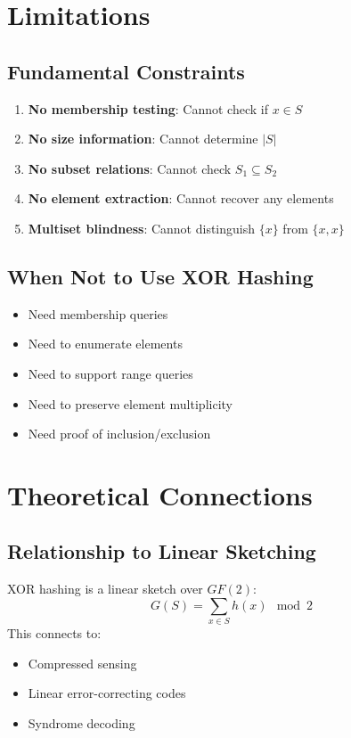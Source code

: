 \documentclass[11pt,final,hidelinks]{article}
\begin{document}
\section{Limitations}

\subsection{Fundamental Constraints}

\begin{enumerate}
    \item \textbf{No membership testing}: Cannot check if $x \in S$
    \item \textbf{No size information}: Cannot determine $|S|$
    \item \textbf{No subset relations}: Cannot check $S_1 \subseteq S_2$
    \item \textbf{No element extraction}: Cannot recover any elements
    \item \textbf{Multiset blindness}: Cannot distinguish $\{x\}$ from $\{x, x\}$
\end{enumerate}

\subsection{When Not to Use XOR Hashing}

\begin{itemize}
    \item Need membership queries
    \item Need to enumerate elements
    \item Need to support range queries
    \item Need to preserve element multiplicity
    \item Need proof of inclusion/exclusion
\end{itemize}

\section{Theoretical Connections}

\subsection{Relationship to Linear Sketching}

XOR hashing is a linear sketch over $GF(2)$:
\begin{equation}
G(S) = \sum_{x \in S} h(x) \mod 2
\end{equation}
This connects to:
\begin{itemize}
    \item Compressed sensing
    \item Linear error-correcting codes
    \item Syndrome decoding
\end{itemize}
\end{document}
